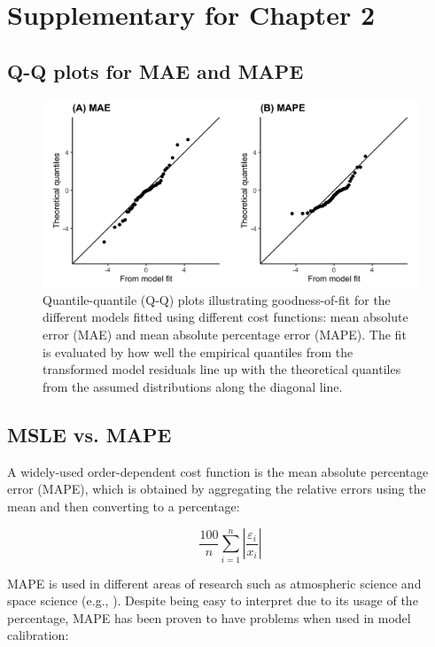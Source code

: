 \chapter{Supplementary for Chapter 2} \label{app-tephra}


\section{Q-Q plots for MAE and MAPE}\label{supp-a}
    
    \begin{figure}[htbp]
    \centering
    \includegraphics[width=0.9\linewidth]{Figures/fig10_qq-plots-others.png}
    \caption{Quantile-quantile (Q-Q) plots illustrating goodness-of-fit for the different models fitted using different cost functions: mean absolute error (MAE) and mean absolute percentage error (MAPE). The fit is evaluated by how well the empirical quantiles from the transformed model residuals line up with the theoretical quantiles from the assumed distributions along the diagonal line.}
    \end{figure}

\section{MSLE vs. MAPE}\label{supp-b}
    
    A widely-used order-dependent cost function is the mean absolute percentage error (MAPE), which is obtained by aggregating the relative errors using the mean and then converting to a percentage: 
    
    \begin{equation}
    \frac{100}{n} \sum_{i=1}^{n} \left | \frac{\varepsilon_{i}}{x_{i}}  \right |
    \end{equation}
    
    MAPE is used in different areas of research such as atmospheric science and space science (e.g., \cite{grillakis2013multisegment, zheng2015linear, zhelavskaya2016automated}). Despite being easy to interpret due to its usage of the percentage, MAPE has been proven to have problems when used in model calibration:
    
